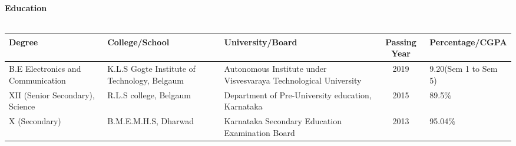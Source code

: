 \documentclass[15pt]{article}
\begin{document}
\vspace{1mm}
\begin{flushleft}
	{\textbf{Education }} \\
	\vspace{0.5mm}
	\noindent \hrulefill 
	\vspace{0.5mm} \\
	\begin{tabular}{|p{3cm}|p{3cm}|p{3cm}|c|p{3cm}|}
		\hline
		Degree & College/School & University/Board & Passing Year & Percentage/CGPA \\
		\hline 
		B.E Electronics and Communication & K.L.S Gogte Institute of Technology, Belgaum & Autonomous Institute under Visvesvaraya Technological University & 2019 & 9.20(Sem 1 to Sem 5) \\
		\hline
		XII (Senior Secondary), Science & R.L.S college, Belgaum & Department of Pre-University education, Karnataka & 2015 & 89.5$\%$ \\
		\hline
		X (Secondary) & B.M.E.M.H.S, Dharwad & Karnataka Secondary Education Examination Board & 2013 & 95.04$\%$ \\
		\hline
	\end{tabular}
\end{flushleft}
\vspace{1mm}
\end{document}
